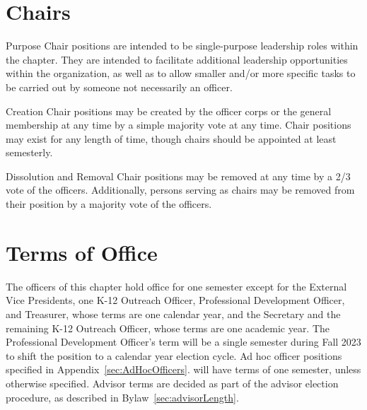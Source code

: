 \section{Chairs}
\begin{enumsubsection}
\item{Purpose} Chair positions are intended to be single-purpose leadership roles within the chapter. They are intended to facilitate additional leadership opportunities within the organization, as well as to allow smaller and/or more specific tasks to be carried out by someone not necessarily an officer. %
\item{Creation} Chair positions may be created by the officer corps or the general membership at any time by a simple majority vote at any time. Chair positions may exist for any length of time, though chairs should be appointed at least semesterly.
\item{Dissolution and Removal} Chair positions may be removed at any time by a 2/3 vote of the officers. Additionally, persons serving as chairs may be removed from their position by a majority vote of the officers.
\end{enumsubsection}

\section{Terms of Office} The officers of this chapter hold office for one semester except for the External Vice Presidents, one K-12 Outreach Officer, Professional Development Officer, and Treasurer, whose terms are one calendar year, and the Secretary and the remaining K-12 Outreach Officer, whose terms are  one academic year.
 The Professional Development Officer's term will be a single semester during Fall 2023 to shift the position to a calendar year election cycle. Ad hoc officer positions specified in Appendix~\ref{sec:AdHocOfficers}. will have terms of one semester, unless otherwise specified. Advisor terms are decided as part of the advisor election procedure, as described in Bylaw~\ref{sec:advisorLength}. %
